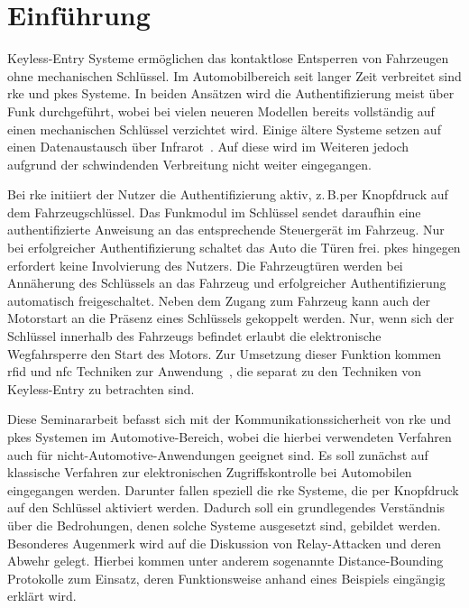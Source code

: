 \chapter{Einführung}

\foreignlanguage{english}{Keyless-Entry} Systeme ermöglichen das kontaktlose Entsperren von Fahrzeugen ohne mechanischen Schlüssel. Im Automobilbereich seit langer Zeit verbreitet sind \gls{rke} und \gls{pkes} Systeme. In beiden Ansätzen wird die Authentifizierung meist über Funk durchgeführt, wobei bei vielen neueren Modellen bereits vollständig auf einen mechanischen Schlüssel verzichtet wird. Einige ältere Systeme setzen auf einen Datenaustausch über Infrarot~\cite[S.\ 930]{Garcia2016}. Auf diese wird im Weiteren jedoch aufgrund der schwindenden Verbreitung nicht weiter eingegangen.

Bei \gls{rke} initiiert der Nutzer die Authentifizierung aktiv, z.\,B.\@ per Knopfdruck auf dem Fahrzeugschlüssel. Das Funkmodul im Schlüssel sendet daraufhin eine authentifizierte Anweisung an das entsprechende Steuergerät im Fahrzeug. Nur bei erfolgreicher Authentifizierung schaltet das Auto die Türen frei. \gls{pkes} hingegen erfordert keine Involvierung des Nutzers. Die Fahrzeugtüren werden bei Annäherung des Schlüssels an das Fahrzeug und erfolgreicher Authentifizierung automatisch freigeschaltet. Neben dem Zugang zum Fahrzeug kann auch der Motorstart an die Präsenz eines Schlüssels gekoppelt werden. Nur, wenn sich der Schlüssel innerhalb des Fahrzeugs befindet erlaubt die elektronische Wegfahrsperre den Start des Motors. Zur Umsetzung dieser Funktion kommen \gls{rfid} und \gls{nfc} Techniken zur Anwendung~\cite{Rainer2010}, die separat zu den Techniken von \foreignlanguage{english}{Keyless-Entry} zu betrachten sind.

Diese Seminararbeit befasst sich mit der Kommunikationssicherheit von \gls{rke} und \gls{pkes} Systemen im Automotive-Bereich, wobei die hierbei verwendeten Verfahren auch für nicht-Automotive-Anwendungen geeignet sind. Es soll zunächst auf klassische Verfahren zur elektronischen Zugriffskontrolle bei Automobilen eingegangen werden. Darunter fallen speziell die \gls{rke} Systeme, die per Knopfdruck auf den Schlüssel aktiviert werden. Dadurch soll ein grundlegendes Verständnis über die Bedrohungen, denen solche Systeme ausgesetzt sind, gebildet werden. Besonderes Augenmerk wird auf die Diskussion von \foreignlanguage{english}{Relay}-Attacken und deren Abwehr gelegt. Hierbei kommen unter anderem sogenannte \foreignlanguage{english}{Distance-Bounding} Protokolle zum Einsatz, deren Funktionsweise anhand eines Beispiels eingängig erklärt wird.
